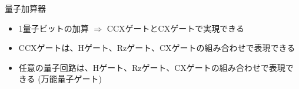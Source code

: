 \begin{frame}[t,fragile]{量子加算器}
  \begin{itemize}
  \item 1量子ビットの加算 $\Rightarrow$ CCXゲートとCXゲートで実現できる
    \begin{center}
    \end{center}
  \item CCXゲートは、Hゲート、Rzゲート、CXゲートの組み合わせで表現できる
  \item 任意の量子回路は、Hゲート、Rzゲート、CXゲートの組み合わせで表現できる (万能量子ゲート)
  \end{itemize}
\end{frame}
